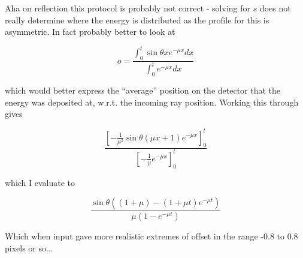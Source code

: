 \documentclass{article}
\begin{document}
Aha on reflection this protocol is probably not correct - solving for
$s$ does not really determine where the energy is distributed as the
profile for this is asymmetric. In fact probably better to look at

\begin{equation}
o = \frac{\int_0^t \sin \theta x e^{-\mu x} dx}{\int_0^t e^{-\mu x} dx}
\end{equation}

\noindent
which would better express the ``average'' position on the detector
that the energy was deposited at, w.r.t. the incoming ray
position. Working this through gives

\begin{equation}
\frac{\left[ - \frac{1}{\mu^2} \sin \theta \left( \mu x + 1
    \right)e^{-\mu x} \right]_0^t}
{\left[ - \frac{1}{\mu} e^{-\mu x} \right]_0^t}
\end{equation}

\noindent
which I evaluate to

\begin{equation}
\frac{\sin \theta \left( \left( 1 + \mu \right) - \left( 1 + \mu t
    \right) e^{-\mu t}\right)} {\mu \left( 1 - e^{-\mu t} \right)}
\end{equation}

Which when input gave more realistic extremes of offset in the range
-0.8 to 0.8 pixels or so... 
\end{document}
